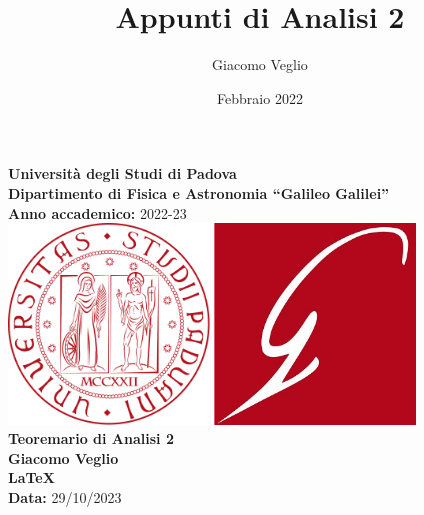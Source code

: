 \documentclass{article}
\title{Appunti di Analisi 2}
\author{Giacomo Veglio}
\date{Febbraio 2022}
\begin{document}
\begin{titlepage}
    \begin{center}
        \vspace*{2.5cm}
        \Large\textbf{Università degli Studi di Padova} \\
        \large\textbf{Dipartimento di Fisica e Astronomia  “Galileo Galilei”}\\
        \textbf{Anno accademico:} 2022-23\\
        \vspace{30pt}
        \includegraphics[width=0.4\textwidth]{UniPdlogo.png}
        \hspace{30pt}
        \includegraphics[width=0.4\textwidth]{DFALogo.jpg}\\
        \vspace{30pt}
        \hline
        \vspace{15pt}
        \large\textbf{Teoremario di Analisi 2}\\
        \vspace{15pt}
        \hline
        \vspace{30pt}
        \textbf{Giacomo Veglio}\\
        \vspace{15pt}
        \textbf{La\TeX}\\
        \vspace{15pt}
        \textbf{Data:} 29/10/2023\\
    \end{center}
\end{titlepage}
\end{document}

